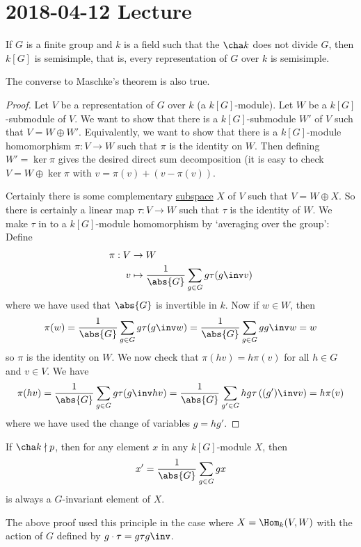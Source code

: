 \section{2018-04-12 Lecture}

\begin{thm}
	If $G$ is a finite group and $k$ is a field such that the $\cha k$ does not divide $G$, then $k[G]$ is semisimple, that is, every representation of $G$ over $k$ is semisimple.
\end{thm}

\begin{rmk}
	The converse to Maschke's theorem is also true.
\end{rmk}

\begin{proof}
	Let $V$ be a representation of $G$ over $k$ (a $k[G]$-module).
	Let $W$ be a $k[G]$-submodule of $V$.
	We want to show that there is a $k[G]$-submodule $W'$ of $V$ such that $V=W\oplus W'$.
	Equivalently, we want to show that there is a $k[G]$-module homomorphism $\pi: V \to W$ such that $\pi$ is the identity on $W$.
	Then defining $W'=\ker\pi$ gives the desired direct sum decomposition (it is easy to check $V=W\oplus\ker\pi$ with $v=\pi(v)+(v-\pi(v))$.
	
	Certainly there is some complementary \underline{subspace} $X$ of $V$ such that $V=W\oplus X$.
	So there is certainly a linear map $\tau:V \to W$ such that $\tau$ is the identity of $W$.
	We make $\tau$ in to a $k[G]$-module homomorphism by `averaging over the group':
	Define
	\begin{align*}
		\pi: V &\to W \\
		v &\mapsto \frac 1{\abs{G}} \sum_{g \in G} g \tau(g\inv v)
	\end{align*}
	where we have used that $\abs{G}$ is invertible in $k$.	
	Now if $w \in W$, then
	\[\pi(w) = \frac 1{\abs{G}} \sum_{g \in G} g\tau(g\inv w) = \frac 1{\abs{G}} \sum_{g \in G} gg\inv w = w \]
	so $\pi$ is the identity on $W$.
	We now check that $\pi(hv)=h\pi(v)$ for all $h \in G$ and $v \in V$.
	We have
	\[\pi(hv) = \frac 1{\abs{G}} \sum_{g \in G} g\tau(g\inv hv) = \frac 1{\abs{G}} \sum_{g' \in G} hg\tau\left((g')\inv v\right) = h\pi(v)\]
	where we have used the change of variables $g=hg'$.
\end{proof}

\begin{rmk}
	If $\cha k \nmid p$, then for any element $x$ in any $k[G]$-module $X$, then
	\[x' = \frac 1{\abs{G}} \sum_{g \in G} gx\]
	is always a $G$-invariant element of $X$.
	
	The above proof used this principle in the case where $X=\Hom_k(V,W)$ with the action of $G$ defined by $g \cdot\tau = g\tau g\inv$.
\end{rmk}

